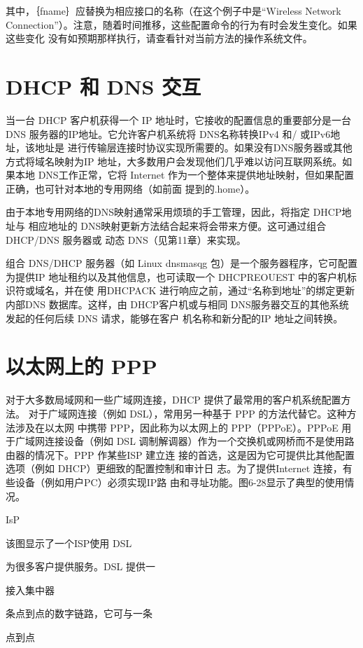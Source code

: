 其中，｛fname｝应替换为相应接口的名称（在这个例子中是“Wireless Network
Connection”）。注意，随着时间推移，这些配置命令的行为有时会发生变化。如果这些变化
没有如预期那样执行，请查看针对当前方法的操作系统文件。

\section{DHCP 和 DNS 交互}
当一台 DHCP 客户机获得一个 IP 地址时，它接收的配置信息的重要部分是一台 DNS
服务器的IP地址。它允许客户机系统将 DNS名称转换IPv4 和/ 或IPv6地址，该地址是
进行传输层连接时协议实现所需要的。如果没有DNS服务器或其他方式将域名映射为IP
地址，大多数用户会发现他们几乎难以访问互联网系统。如果本地 DNS工作正常，它将
Internet 作为一个整体来提供地址映射，但如果配置正确，也可针对本地的专用网络（如前面
提到的.home）。

由于本地专用网络的DNS映射通常采用烦琐的手工管理，因此，将指定 DHCP地址与
相应地址的 DNS映射更新方法结合起来将会带来方便。这可通过组合DHCP/DNS 服务器或
动态 DNS（见第11章）来实现。

组合 DNS/DHCP 服务器（如 Linux dnsmasqg 包）是一个服务器程序，它可配置为提供IP
地址租约以及其他信息，也可读取一个 DHCPREOUEST 中的客户机标识符或域名，并在使
用DHCPACK 进行响应之前，通过“名称到地址”的绑定更新内部DNS 数据库。这样，由
DHCP客户机或与相同 DNS服务器交互的其他系统发起的任何后续 DNS 请求，能够在客户
机名称和新分配的IP 地址之间转换。

\section{以太网上的 PPP}

对于大多数局域网和一些广域网连接，DHCP 提供了最常用的客户机系统配置方法。
对于广域网连接（例如 DSL），常用另一种基于 PPP 的方法代替它。这种方法涉及在以太网
中携带 PPP，因此称为以太网上的 PPP（PPPoE）。PPPoE 用于广域网连接设备（例如 DSL
调制解调器）作为一个交换机或网桥而不是使用路由器的情况下。PPP 作某些ISP 建立连
接的首选，这是因为它可提供比其他配置选项（例如 DHCP）更细致的配置控制和审计日
志。为了提供Internet 连接，有些设备（例如用户PC）必须实现IP路
由和寻址功能。图6-28显示了典型的使用情况。

IsP

该图显示了一个ISP使用 DSL

为很多客户提供服务。DSL 提供一

接入集中器

条点到点的数字链路，它可与一条

点到点

